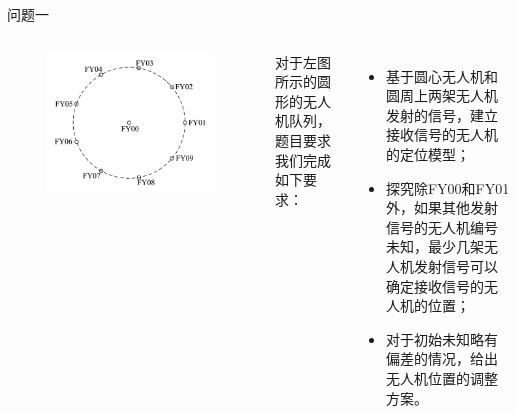 \documentclass[aspectratio=169]{beamer}
\begin{document}
\begin{frame}{问题一}
    \begin{columns}
        \begin{figure}[!ht]
            \centering
            \includegraphics[width=\textwidth]{图片/无人机以及编号示意图.pdf}
        \end{figure}
        对于左图所示的圆形的无人机队列，题目要求我们完成如下要求：
        \begin{itemize}
            \item 基于圆心无人机和圆周上两架无人机发射的信号，建立接收信号的无人机的定位模型；
            \item 探究除FY00和FY01外，如果其他发射信号的无人机编号未知，最少几架无人机发射信号可以确定接收信号的无人机的位置；
            \item 对于初始未知略有偏差的情况，给出无人机位置的调整方案。
        \end{itemize}
    \end{columns}
\end{frame}
\end{document}
